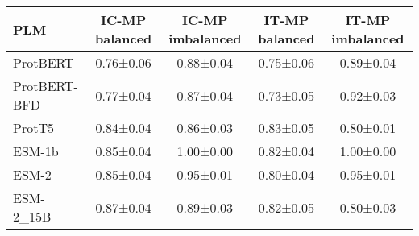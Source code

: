 \begin{tabular}{lcccc}
\toprule
         \textbf{PLM} & \textbf{IC-MP balanced} & \textbf{IC-MP imbalanced} & \textbf{IT-MP balanced} & \textbf{IT-MP imbalanced} \\
\midrule
    ProtBERT &      0.76±0.06 &        0.88±0.04 &      0.75±0.06 &        0.89±0.04 \\
ProtBERT-BFD &      0.77±0.04 &        0.87±0.04 &      0.73±0.05 &        0.92±0.03 \\
      ProtT5 &      0.84±0.04 &        0.86±0.03 &      0.83±0.05 &        0.80±0.01 \\
      ESM-1b &      0.85±0.04 &        1.00±0.00 &      0.82±0.04 &        1.00±0.00 \\
       ESM-2 &      0.85±0.04 &        0.95±0.01 &      0.80±0.04 &        0.95±0.01 \\
   ESM-2\_15B &      0.87±0.04 &        0.89±0.03 &      0.82±0.05 &        0.80±0.03 \\
\bottomrule
\end{tabular}

